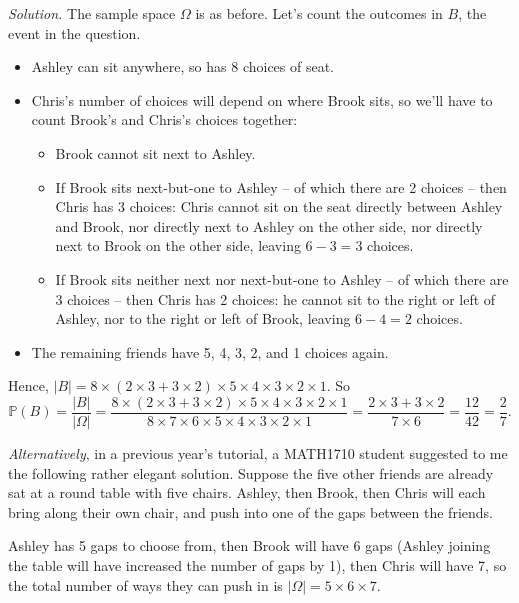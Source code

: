 \documentclass[
  a4paper,
]{book}
\providecommand{\tightlist}{%
  \setlength{\itemsep}{0pt}\setlength{\parskip}{0pt}}
\theoremstyle{definition}
\theoremstyle{definition}
\theoremstyle{definition}
\theoremstyle{definition}
\theoremstyle{remark}
\begin{document}
\begin{myanswers}
\emph{Solution.}
The sample space \(\Omega\) is as before. Let's count the outcomes in \(B\), the event in the question.

\begin{itemize}
\tightlist
\item
  Ashley can sit anywhere, so has 8 choices of seat.
\item
  Chris's number of choices will depend on where Brook sits, so we'll have to count Brook's and Chris's choices together:

  \begin{itemize}
  \tightlist
  \item
    Brook cannot sit next to Ashley.
  \item
    If Brook sits next-but-one to Ashley -- of which there are 2 choices -- then Chris has 3 choices: Chris cannot sit on the seat directly between Ashley and Brook, nor directly next to Ashley on the other side, nor directly next to Brook on the other side, leaving \(6-3=3\) choices.
  \item
    If Brook sits neither next nor next-but-one to Ashley -- of which there are 3 choices -- then Chris has 2 choices: he cannot sit to the right or left of Ashley, nor to the right or left of Brook, leaving \(6-4=2\) choices.
  \end{itemize}
\item
  The remaining friends have 5, 4, 3, 2, and 1 choices again.
\end{itemize}

Hence, \(|B| = 8 \times (2\times 3 + 3 \times 2) \times 5 \times 4 \times 3 \times 2 \times 1\). So
\[ \mathbb P(B) = \frac{|B|}{|\Omega|} = \frac{8 \times (2\times 3 + 3 \times 2) \times 5 \times 4 \times 3 \times 2 \times 1}{8 \times 7 \times 6 \times 5 \times 4 \times 3 \times 2 \times 1} = \frac{2\times 3 + 3 \times 2}{7 \times 6} = \frac{12}{42} = \frac{2}{7} .  \]

\emph{Alternatively}, in a previous year's tutorial, a MATH1710 student suggested to me the following rather elegant solution. Suppose the five other friends are already sat at a round table with five chairs. Ashley, then Brook, then Chris will each bring along their own chair, and push into one of the gaps between the friends.

Ashley has 5 gaps to choose from, then Brook will have 6 gaps (Ashley joining the table will have increased the number of gaps by 1), then Chris will have 7, so the total number of ways they can push in is \(|\Omega| = 5 \times 6 \times 7\).


\end{myanswers}
\end{document}
